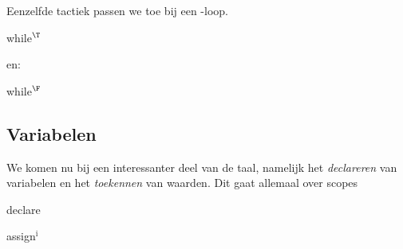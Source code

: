 Eenzelfde tactiek passen we toe bij een \WHILE-loop.

\begin{NSAxiom}{while$^\T$}
  \begin{prooftree}
  \end{prooftree}
  \begin{NSConditions}
  \end{NSConditions}
\end{NSAxiom}

en:

\begin{NSAxiom}{while$^\F$}
  \begin{prooftree}
  \end{prooftree}
  \begin{NSConditions}
  \end{NSConditions}
\end{NSAxiom}

\subsection{Variabelen}

We komen nu bij een interessanter deel van de taal, namelijk het \emph{declareren} van variabelen en het \emph{toekennen} van waarden. Dit gaat allemaal over scopes

\begin{NSAxiom}{declare}
  \begin{prooftree}
  \end{prooftree}
  \begin{NSConditions}
  \end{NSConditions}
\end{NSAxiom}

\begin{NSAxiom}{assign$^\text{i}$}
  \begin{prooftree}
  \end{prooftree}
  \begin{NSConditions}
  \end{NSConditions}
\end{NSAxiom}

